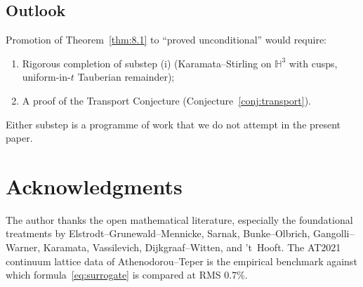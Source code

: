 \documentclass[11pt,a4paper,reqno]{amsart}
\theoremstyle{definition}
\newcommand{\HH}{\mathbb{H}}
\begin{document}
\subsection{Outlook}\label{ss:outlook}
Promotion of Theorem~\ref{thm:8.1} to ``proved unconditional'' would require:
\begin{enumerate}[leftmargin=2em]
   \item Rigorous completion of substep (i) (Karamata--Stirling on $\HH^3$ with cusps, uniform-in-$t$ Tauberian remainder);
   \item A proof of the Transport Conjecture (Conjecture~\ref{conj:transport}).
\end{enumerate}
Either substep is a programme of work that we do not attempt in the present paper.

\section{Acknowledgments}\label{sec:acks}

The author thanks the open mathematical literature, especially the foundational treatments by Elstrodt--Grunewald--Mennicke, Sarnak, Bunke--Olbrich, Gangolli--Warner, Karamata, Vassilevich, Dijkgraaf--Witten, and 't~Hooft. The AT2021 continuum lattice data of Athenodorou--Teper is the empirical benchmark against which formula~\eqref{eq:surrogate} is compared at RMS $0.7\%$.



\end{document}
